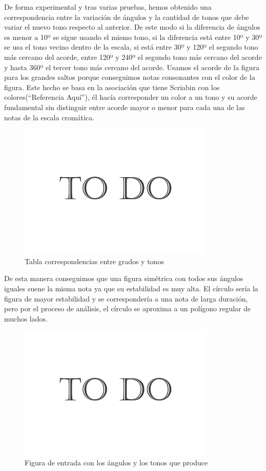 De forma experimental y tras varias pruebas, hemos obtenido una correspondencia entre la variación de ángulos y la cantidad de tonos que debe variar el nuevo tono respecto al anterior. De este modo si la diferencia de ángulos es menor a 10º se sigue usando el mismo tono, si la diferencia está entre 10º y 30º se usa el tono vecino dentro de la escala, si está entre 30º y 120º el segundo tono más cercano del acorde, entre 120º y 240º el segundo tono más cercano del acorde y hasta 360º el tercer tono más cercano del acorde. Usamos el acorde de la figura para los grandes saltos porque conseguimos notas consonantes con el color de la figura. Este hecho se basa en la asociación que tiene Scriabin con los colores(``Referencia Aquí''), él hacía corresponder un color a un tono y su acorde fundamental sin distinguir entre acorde mayor o menor para cada una de las notas de la escala cromática.

		\begin{figure}[htbp]
		\centering
		\hspace*{0.0in}
		\includegraphics[scale=0.57]{graphics/todo.png}
		\caption{Tabla correspondencias entre grados y tonos}
		\label{fig:Figura3Voz1}
		\end{figure}

De esta manera conseguimos que una figura simétrica con todos sus ángulos iguales suene la misma nota ya que su estabilidad es muy alta. El círculo sería la figura de mayor estabilidad y se correspondería a una nota de larga duración, pero por el proceso de análisis, el círculo se aproxima a un polígono regular de muchos lados.

		\begin{figure}[htbp]
		\centering
		\hspace*{0.0in}
		\includegraphics[scale=0.57]{graphics/todo.png}
		\caption{Figura de entrada con los ángulos y los tonos que produce}
		\label{fig:Figura4Voz1}
		\end{figure}

